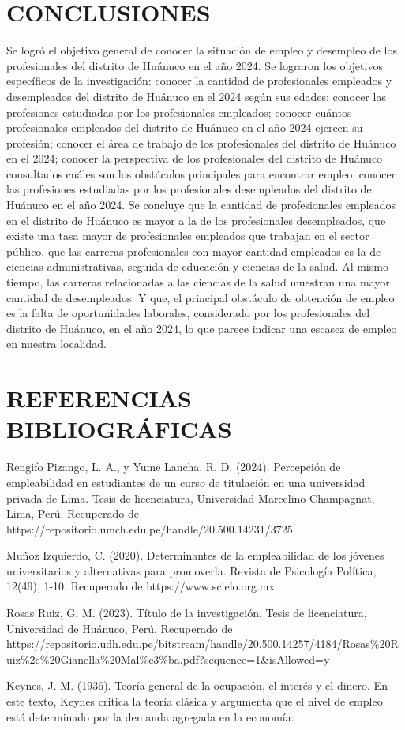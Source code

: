 \documentclass[12pt, a4paper]{article}
\begin{document}
\section{CONCLUSIONES}
Se logró el objetivo general de conocer la situación de empleo y desempleo de los profesionales del distrito de Huánuco en el año 2024. Se lograron los objetivos específicos de la investigación: conocer la cantidad de profesionales empleados y desempleados del distrito de Huánuco en el 2024 según sus edades; conocer las profesiones estudiadas por los profesionales empleados; conocer cuántos profesionales empleados del distrito de Huánuco en el año 2024 ejercen su profesión; conocer el área de trabajo de los profesionales del distrito de Huánuco en el 2024; conocer la perspectiva de los profesionales del distrito de Huánuco consultados cuáles son los obstáculos principales para encontrar empleo; conocer las profesiones estudiadas por los profesionales desempleados del distrito de Huánuco en el año 2024. Se concluye que la cantidad de profesionales empleados en el distrito de Huánuco es mayor a la de los profesionales desempleados, que existe una tasa mayor de profesionales empleados que trabajan en el sector público, que las carreras profesionales con mayor cantidad empleados es la de ciencias administrativas, seguida de educación y ciencias de la salud. Al mismo tiempo, las carreras relacionadas a las ciencias de la salud muestran una mayor cantidad de desempleados. Y que, el principal obstáculo de  obtención de empleo es la falta de oportunidades laborales, considerado por los profesionales del distrito de Huánuco, en el año 2024, lo que parece indicar una escasez de empleo en nuestra localidad.


\section{REFERENCIAS BIBLIOGRÁFICAS}

Rengifo Pizango, L. A., y Yume Lancha, R. D. (2024). Percepción de empleabilidad en estudiantes de un curso de titulación en una universidad privada de Lima. Tesis de licenciatura, Universidad Marcelino Champagnat, Lima, Perú. Recuperado de https://repositorio.umch.edu.pe/handle/20.500.14231/3725

Muñoz Izquierdo, C. (2020). Determinantes de la empleabilidad de los jóvenes universitarios y alternativas para promoverla. Revista de Psicología Política, 12(49), 1-10. Recuperado de https://www.scielo.org.mx

Rosas Ruiz, G. M. (2023). Título de la investigación. Tesis de licenciatura, Universidad de Huánuco, Perú. Recuperado de https://repositorio.udh.edu.pe/bitstream/handle/20.500.14257/4184/Rosas\%20Ruiz\%2c\%20Gianella\%20Mal\%c3\%ba.pdf?sequence=1\&isAllowed=y

Keynes, J. M. (1936). Teoría general de la ocupación, el interés y el dinero. En este texto, Keynes critica la teoría clásica y argumenta que el nivel de empleo está determinado por la demanda agregada en la economía.
\end{document}
